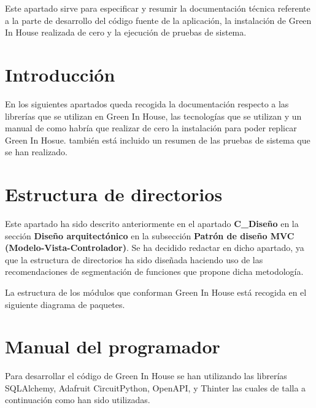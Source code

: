 Este apartado sirve para especificar y resumir la documentación técnica referente a la parte de desarrollo del código fuente de la aplicación, la instalación de Green In House realizada de cero y la ejecución de pruebas de sistema.

\section{Introducción}
En los siguientes apartados queda recogida la documentación respecto a las librerías que se utilizan en Green In House, las tecnologías que se utilizan y un manual de como habría que realizar de cero la instalación para poder replicar Green In Hosue. también está incluido un resumen de las pruebas de sistema que se han realizado. 

\section{Estructura de directorios}
Este apartado ha sido descrito anteriormente en el apartado \textbf{C\_Diseño} en la sección \textbf{Diseño arquitectónico} en la subsección \textbf{Patrón de diseño MVC (Modelo-Vista-Controlador)}. Se ha decidido redactar en dicho apartado, ya que la estructura de directorios ha sido diseñada haciendo uso de las recomendaciones de segmentación de funciones que propone dicha metodología.

La estructura de los módulos que conforman Green In House está recogida en el siguiente diagrama de paquetes.

   
    
\section{Manual del programador}
Para desarrollar el código de Green In House se han utilizando las librerías SQLAlchemy, Adafruit CircuitPython, OpenAPI, y Thinter las cuales de talla a continuación como han sido utilizadas.

